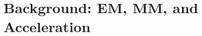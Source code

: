 \documentclass{statsoc}
\newcommand{\ma}[1]{{\color{orange}{ #1}}}
\begin{document}





\section{Background: EM, MM, and Acceleration}
\end{document}
